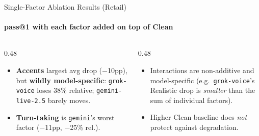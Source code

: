 \documentclass[aspectratio=169]{beamer}
\begin{document}
\begin{frame}{Single-Factor Ablation Results (Retail)}
  \framesubtitle{pass@1 with each factor added on top of Clean}

  \begin{center}
  \begin{small}
  \end{small}
  \end{center}

  \vspace{0.6em}
  \begin{columns}[T]
    \begin{column}{0.48\textwidth}
      \begin{itemize}
        \item \textbf{Accents} largest avg drop ($-$10pp), but \textbf{wildly model-specific}: \texttt{grok-voice} loses 38\% relative; \texttt{gemini-live-2.5} barely moves.
        \item \textbf{Turn-taking} is \texttt{gemini}'s worst factor ($-$11pp, $-$25\% rel.).
      \end{itemize}
    \end{column}
    \begin{column}{0.48\textwidth}
      \begin{itemize}
        \item Interactions are non-additive and model-specific (e.g.\ \texttt{grok-voice}'s Realistic drop is \emph{smaller} than the sum of individual factors).
        \item Higher Clean baseline does \emph{not} protect against degradation.
      \end{itemize}
    \end{column}
  \end{columns}

\end{frame}
\end{document}
